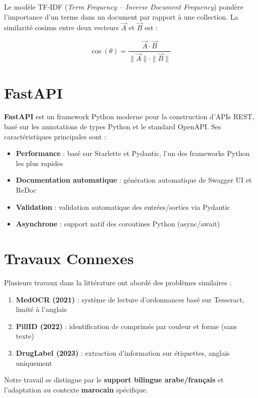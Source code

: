 \documentclass[12pt,a4paper]{report}
\newcommand{\en}[1]{\textit{\textit{#1}}}
\begin{document}
Le mod\`ele TF-IDF (\en{Term Frequency -- Inverse Document Frequency}) pond\`ere l'importance d'un terme dans un document par rapport \`a une collection. La similarit\'e cosinus entre deux vecteurs $\vec{A}$ et $\vec{B}$ est :

\begin{equation}
\cos(\theta) = \frac{\vec{A} \cdot \vec{B}}{\|\vec{A}\| \cdot \|\vec{B}\|}
\end{equation}

\section{FastAPI}

\textbf{FastAPI} est un framework Python moderne pour la construction d'APIs REST, bas\'e sur les annotations de types Python et le standard OpenAPI. Ses caract\'eristiques principales sont :

\begin{itemize}
  \item \textbf{Performance} : bas\'e sur Starlette et Pydantic, l'un des frameworks Python les plus rapides
  \item \textbf{Documentation automatique} : g\'en\'eration automatique de Swagger UI et ReDoc
  \item \textbf{Validation} : validation automatique des entr\'ees/sorties via Pydantic
  \item \textbf{Asynchrone} : support natif des coroutines Python (async/await)
\end{itemize}

\section{Travaux Connexes}

Plusieurs travaux dans la litt\'erature ont abord\'e des probl\`emes similaires :

\begin{enumerate}
  \item \textbf{MedOCR (2021)} : syst\`eme de lecture d'ordonnances bas\'e sur Tesseract, limit\'e \`a l'anglais
  \item \textbf{PillID (2022)} : identification de comprim\'es par couleur et forme (sans texte)
  \item \textbf{DrugLabel (2023)} : extraction d'information sur \'etiquettes, anglais uniquement
\end{enumerate}

Notre travail se distingue par le \textbf{support bilingue arabe/fran\c{c}ais} et l'adaptation au contexte \textbf{marocain} sp\'ecifique.
\end{document}

